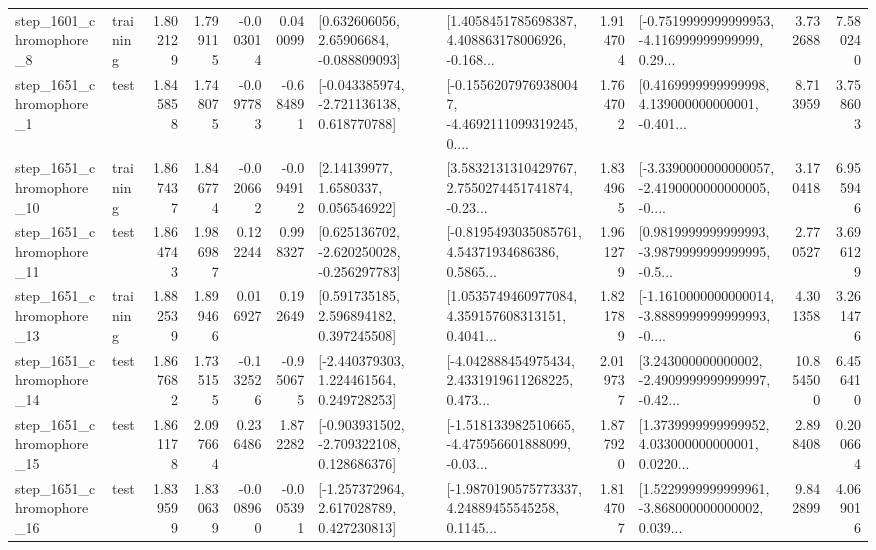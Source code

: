 \begin{tabular}{llrrrrllrlrr}
  step\_1601\_chromophore\_8 &  training &      1.802129 &    1.799115 &     -0.003014 &  0.040099 &     [0.632606056, 2.65906684, -0.088809093] &  [1.4058451785698387, 4.408863178006926, -0.168... &       1.914704 &  [-0.7519999999999953, -4.116999999999999, 0.29... &            3.732688 &          7.580240 \\
  step\_1651\_chromophore\_1 &      test &      1.845858 &    1.748075 &     -0.097783 & -0.684891 &   [-0.043385974, -2.721136138, 0.618770788] &  [-0.15562079769380047, -4.4692111099319245, 0.... &       1.764702 &  [0.4169999999999998, 4.139000000000001, -0.401... &            8.713959 &          3.758603 \\
 step\_1651\_chromophore\_10 &  training &      1.867437 &    1.846774 &     -0.020662 & -0.094912 &        [2.14139977, 1.6580337, 0.056546922] &  [3.5832131310429767, 2.7550274451741874, -0.23... &       1.834965 &  [-3.3390000000000057, -2.4190000000000005, -0.... &            3.170418 &          6.955946 \\
 step\_1651\_chromophore\_11 &      test &      1.864743 &    1.986987 &      0.122244 &  0.998327 &   [0.625136702, -2.620250028, -0.256297783] &  [-0.8195493035085761, 4.54371934686386, 0.5865... &       1.961279 &  [0.9819999999999993, -3.9879999999999995, -0.5... &            2.770527 &          3.696129 \\
 step\_1651\_chromophore\_13 &  training &      1.882539 &    1.899466 &      0.016927 &  0.192649 &     [0.591735185, 2.596894182, 0.397245508] &  [1.0535749460977084, 4.359157608313151, 0.4041... &       1.821789 &  [-1.1610000000000014, -3.8889999999999993, -0.... &            4.301358 &          3.261476 \\
 step\_1651\_chromophore\_14 &      test &      1.867682 &    1.735155 &     -0.132526 & -0.950675 &    [-2.440379303, 1.224461564, 0.249728253] &  [-4.042888454975434, 2.4331919611268225, 0.473... &       2.019737 &  [3.243000000000002, -2.4909999999999997, -0.42... &           10.854500 &          6.456410 \\
 step\_1651\_chromophore\_15 &      test &      1.861178 &    2.097664 &      0.236486 &  1.872282 &   [-0.903931502, -2.709322108, 0.128686376] &  [-1.518133982510665, -4.475956601888099, -0.03... &       1.877920 &  [1.3739999999999952, 4.033000000000001, 0.0220... &            2.898408 &          0.200664 \\
 step\_1651\_chromophore\_16 &      test &      1.839599 &    1.830639 &     -0.008960 & -0.005391 &    [-1.257372964, 2.617028789, 0.427230813] &  [-1.9870190575773337, 4.24889455545258, 0.1145... &       1.814707 &  [1.5229999999999961, -3.868000000000002, 0.039... &            9.842899 &          4.069016 \\

\end{tabular}
